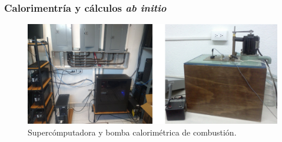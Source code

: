 \documentclass{beamer}
\begin{document}

\begin{frame}[fragile]
\frametitle{Calorimentría y cálculos \textit{ab initio}}

\begin{figure}
\includegraphics[scale=.150]{images/LNS.png}
\caption{Supercómputadora y bomba calorimétrica de combustión.}
\end{figure}

\end{frame}
\end{document}
